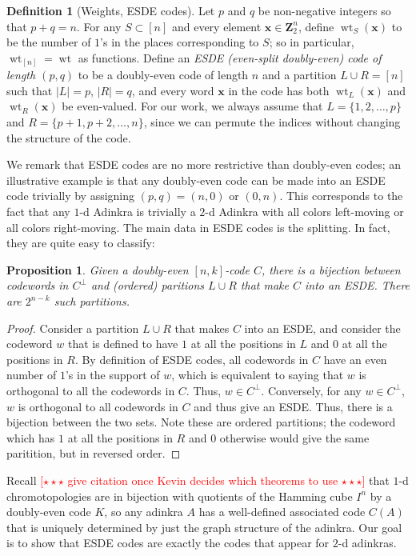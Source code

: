 \documentclass[12pt,twoside,singlespace]{article}
\numberwithin{equation}{section}
\newtheorem{prop}[equation]{Proposition}
\theoremstyle{definition}
\newtheorem{definition}[equation]{Definition}
\newcommand{\ZZ}{\mathbf{Z}}
\newcommand{\on}{\operatorname}
\newcommand{\wt}{\on{wt}}
\newcommand{\com}[1]{\textcolor{red}{$[\star \star \star$ #1 $\star \star \star]$}}
\renewcommand{\vec}[1]{\mathbf{#1}}
\begin{document}
\begin{definition}[Weights, ESDE codes]
Let $p$ and $q$ be non-negative integers so that $p+q=n$. For any $S \subset [n]$ and every element $\vec{x} \in \ZZ_2^n$, define $\wt_S(\vec{x})$ to be the number of $1$'s in the places corresponding to $S$; so in particular, $\wt_{[n]} = \wt$ as functions. Define an \emph{ESDE (even-split doubly-even) code of length $(p,q)$} to be a doubly-even code of length $n$ and a partition $L \cup R = [n]$ such that $|L| = p$, $|R| = q$, and every word $\vec{x}$ in the code has both $\wt_L(\vec{x})$ and $\wt_R(\vec{x})$ be even-valued. For our work, we always assume that $L = \{1, 2, \ldots, p\}$ and $R = \{p+1, p+2, \ldots, n\}$, since we can permute the indices without changing the structure of the code.
\end{definition}

We remark that ESDE codes are no more restrictive than doubly-even codes; an illustrative example is that any doubly-even code can be made into an ESDE code trivially by assigning $(p,q) = (n, 0)$ or $(0, n)$. This corresponds to the fact that any $1$-d Adinkra is trivially a $2$-d Adinkra with all colors left-moving or all colors right-moving. The main data in ESDE codes is the splitting. In fact, they are quite easy to classify:

\begin{prop}
\label{prop:esde}
Given a doubly-even $[n,k]$-code $C$, there is a bijection between codewords in $C^\perp$ and (ordered) paritions $L \cup R$ that make $C$ into an ESDE. There are $2^{n-k}$ such partitions. 
\end{prop}

\begin{proof}
Consider a partition $L \cup R$ that makes $C$ into an ESDE, and consider the codeword $w$ that is defined to have $1$ at all the positions in $L$ and $0$ at all the positions in $R$. By definition of ESDE codes, all codewords in $C$ have an even number of $1$'s in the support of $w$, which is equivalent to saying that $w$ is orthogonal to all the codewords in $C$. Thus, $w \in C^\perp$. Conversely, for any $w \in C^\perp$, $w$ is orthogonal to all codewords in $C$ and thus give an ESDE. Thus, there is a bijection between the two sets. Note these are ordered partitions; the codeword which has $1$ at all the positions in $R$ and $0$ otherwise would give the same paritition, but in reversed order.
\end{proof}


Recall \com{give citation once Kevin decides which theorems to use} that $1$-d chromotopologies are in bijection with quotients of the Hamming cube $I^n$ by a doubly-even code $K$, so any adinkra $A$ has a well-defined associated code $C(A)$ that is uniquely determined by just the graph structure of the adinkra. Our goal is to show that ESDE codes are exactly the codes that appear for $2$-d adinkras.
\end{document}
